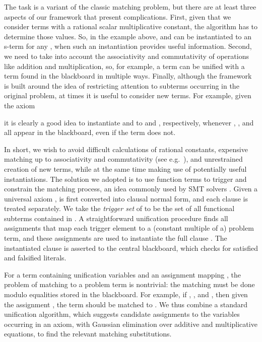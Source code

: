 \documentclass[runningheds]{llncs}
\begin{document}
The task is a variant of the classic matching problem, but there are at least three aspects of our framework that present complications. First, given that we consider terms with a rational scalar multiplicative constant, the algorithm has to determine those values. So, in the example above,  and  can be instantiated to an s-term  for any , when such an instantiation provides useful information. Second, we need to take into account the associativity and commutativity of operations like addition and multiplication, so, for example, a term  can be unified with a term  found in the blackboard in multiple ways. Finally, although the framework is built around the idea of restricting attention to subterms occurring in the original problem, at times it is useful to consider new terms. For example, given the axiom

it is clearly a good idea to instantiate  and  to  and
, respectively, whenever , , and 
all appear in the blackboard, even if the term  does not.

In short, we wish to avoid difficult calculations of rational constants, expensive matching up to associativity and commutativity (see e.g.~\cite{contejean:04}), and unrestrained creation of new terms, while at the same time making use of potentially useful instantiations.
The solution we adopted is to use function terms to trigger and
constrain the matching process, an idea commonly used by SMT solvers \cite{demoura:bjorner:07} \cite{nelson:oppen:79}. Given a universal axiom ,  is first converted into clausal
normal form, and each clause  is treated separately. We take the \emph{trigger set} of  to be the set of all functional subterms contained in . A straightforward unification procedure finds all assignments that map each trigger element to a (constant multiple of a) problem term, and these assignments are used to instantiate the full clause . The instantiated clause is asserted to the central blackboard, which checks for satisfied and falsified literals.

For  a term containing unification variables  and  an assignment mapping , the problem of matching  to a problem term  is nontrivial: the matching must be done modulo equalities stored in the blackboard. For example, if , , and , then given the assignment , the term  should be matched to . We thus combine a standard unification algorithm, which suggests candidate assignments to the variables occurring in an axiom, with Gaussian elimination over additive and multiplicative equations, to find the relevant matching substitutions.
\end{document}
